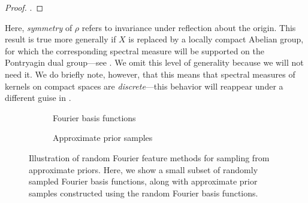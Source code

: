 \documentclass[11pt]{book}
\begin{document}
\begin{proof}
\textcite[Theorem 10.4]{paulsen16}.
\end{proof}

Here, \emph{symmetry} of $\rho$ refers to invariance under reflection about the origin.
This result is true more generally if $X$ is replaced by a locally compact Abelian group, for which the corresponding spectral measure will be supported on the Pontryagin dual group---see \textcite{paulsen16}. 
We omit this level of generality because we will not need it.
We do briefly note, however, that this means that spectral measures of kernels on compact spaces are \emph{discrete}---this behavior will reappear under a different guise in .

\begin{figure}
\begin{subfigure}{0.49\textwidth}

\caption{Fourier basis functions}
\end{subfigure}
\begin{subfigure}{0.49\textwidth}

\caption{Approximate prior samples}
\end{subfigure}
\caption{Illustration of random Fourier feature methods for sampling from approximate priors. Here, we show a small subset of randomly sampled Fourier basis functions, along with approximate prior samples constructed using the random Fourier basis functions.}
\label{fig:gp-rff-prior}
\end{figure}
\end{document}
